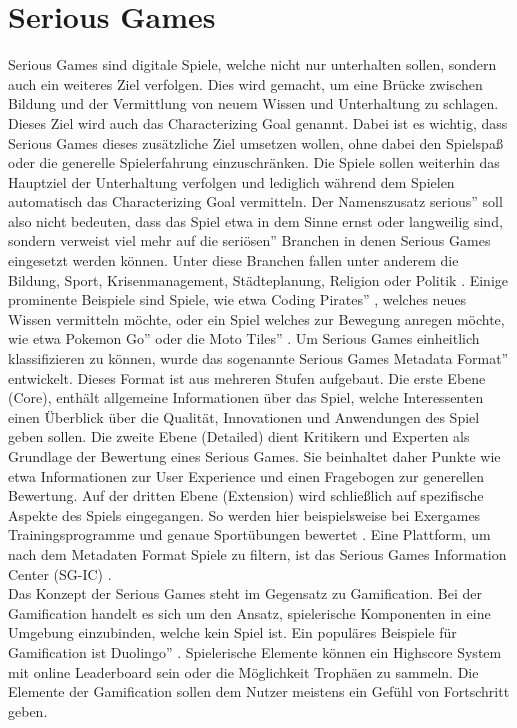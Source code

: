 \section{Serious Games}
Serious Games sind digitale Spiele, welche nicht nur unterhalten sollen, sondern auch ein weiteres Ziel verfolgen. Dies wird gemacht, um eine Brücke zwischen Bildung und der Vermittlung von neuem Wissen und Unterhaltung zu schlagen. Dieses Ziel wird auch das Characterizing Goal genannt. Dabei ist es wichtig, dass Serious Games dieses zusätzliche Ziel umsetzen wollen, ohne dabei den Spielspaß oder die generelle Spielerfahrung einzuschränken. Die Spiele sollen weiterhin das Hauptziel der Unterhaltung verfolgen und lediglich während dem Spielen automatisch das Characterizing Goal vermitteln. Der Namenszusatz \glqq serious'' soll also nicht bedeuten, dass das Spiel etwa in dem Sinne ernst oder langweilig sind, sondern verweist viel mehr auf die \glqq seriösen'' Branchen in denen Serious Games eingesetzt werden können. Unter diese Branchen fallen unter anderem die Bildung, Sport, Krisenmanagement, Städteplanung, Religion oder Politik \cite{gaiasg} . 
Einige prominente Beispiele sind Spiele, wie etwa \glqq Coding Pirates'' \cite{coding_game}, welches neues Wissen vermitteln möchte, oder ein Spiel welches zur Bewegung anregen möchte, wie etwa \glqq Pokemon Go''\cite{althoff2016influence} oder die \glqq Moto Tiles'' \cite{liu2018playful}. Um Serious Games einheitlich klassifizieren zu können, wurde das sogenannte \glqq Serious Games Metadata Format'' entwickelt. Dieses Format ist aus mehreren Stufen aufgebaut. Die erste Ebene (Core), enthält allgemeine Informationen über das Spiel, welche Interessenten einen Überblick über die Qualität, Innovationen und Anwendungen des Spiel geben sollen. Die zweite Ebene (Detailed) dient Kritikern und Experten als Grundlage der Bewertung eines Serious Games. Sie beinhaltet daher Punkte wie etwa Informationen zur User Experience und einen Fragebogen zur generellen Bewertung. Auf der dritten Ebene (Extension) wird schließlich auf spezifische Aspekte des Spiels eingegangen. So werden hier beispielsweise bei Exergames Trainingsprogramme und genaue Sportübungen bewertet \cite{gobel2011makes}. Eine Plattform, um nach dem Metadaten Format Spiele zu filtern, ist das Serious Games Information Center (SG-IC) \cite{sg_ic}. \\
Das Konzept der Serious Games steht im Gegensatz zu Gamification. Bei der Gamification handelt es sich um den Ansatz, spielerische Komponenten in eine Umgebung einzubinden, welche kein Spiel ist. Ein populäres Beispiele für Gamification ist \glqq Duolingo'' \cite{duolingo}. Spielerische Elemente können ein Highscore System mit online Leaderboard sein oder die Möglichkeit Trophäen zu sammeln. Die Elemente der Gamification sollen dem Nutzer meistens ein Gefühl von Fortschritt geben. 

